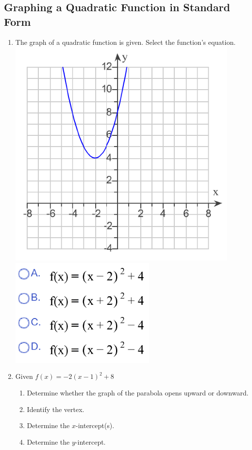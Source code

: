 \newpage


\subsection{Graphing a Quadratic Function in Standard Form}

\begin{enumerate}
\item The graph of a quadratic function is given.  Select the function's equation.\\
\includegraphics[scale=.7]{quad1a}\includegraphics[scale=.7]{quad1b}\\
\item Given $f(x)=-2(x-1)^2+8$
\begin{enumerate}
\item Determine whether the graph of the parabola opens upward or downward.\\[.3in]
\item Identify the vertex.\\[.3in]
\item Determine the $x$-intercept(s).\\[1in]
\item Determine the $y$-intercept.\\[.5in]


\end{enumerate}
\end{enumerate}
